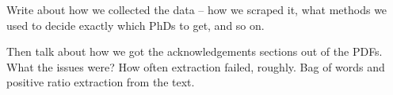 Write about how we collected the data -- how we scraped it, what methods we used to decide exactly which PhDs to get, and so on.

Then talk about how we got the acknowledgements sections out of the PDFs. What the issues were? How often extraction failed, roughly. Bag of words and positive ratio extraction from the text.